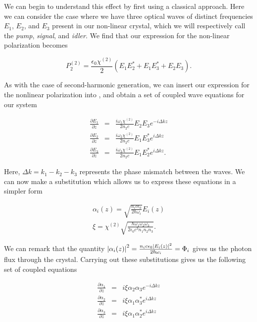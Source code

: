 We can begin to understand this effect by first using a classical approach.  Here we can consider the case where we have three optical waves of distinct frequencies $E_1$, $E_2$, and $E_3$ present in our non-linear crystal, which we will respectively call the \emph{pump}, \emph{signal}, and \emph{idler}.  We find that our expression for the non-linear polarization becomes \cite{boyd} 

\begin{equation}
  \label{eq:dfg_pnl}
  P^{(2)}_2 = \frac{\epsilon_0 \chi^{(2)}}{2} \left( E_1 E^*_2 + E_1E^*_3 + E_2E_3 \right) . 
\end{equation}

\noindent
As with the case of second-harmonic generation, we can insert our expression for the nonlinear polarization into , and obtain a set of coupled wave equations for our system \cite{Fabre90} 

\begin{eqnarray}
  \label{eq:pdc_coupled_equations}
  \frac{\partial E_1}{\partial z} &=& \frac{i \omega_1 \chi^{(2)}}{2n_2 c} E_2 E_3 e^{-i\Delta k z} \\
  \frac{\partial E_2}{\partial z} &=& \frac{i \omega_2 \chi^{(2)}}{2n_2 c} E_1 E^*_3 e^{i\Delta k z} \\
  \frac{\partial E_3}{\partial z} &=& \frac{i \omega_3 \chi^{(2)}}{2n_2 c} E_1 E^*_2e^{i\Delta k z}  .
\end{eqnarray}

\noindent
Here, $\Delta k = k_1 - k_2 - k_3$ represents the phase mismatch between the waves.  We can now make a substitution which allows us to express these equations in a simpler form

\begin{align}
  \label{eq:pdc_substitutations}
  \alpha_i(z) = \sqrt{\frac{n_i c \epsilon_0}{2 \hbar \omega_i}} E_i(z)  \\
  \xi =  \chi^{(2)} \sqrt{\frac{\hbar \omega_1 \omega_2 \omega_3}{2 \epsilon_0 c^3 n_1 n_2 n_3} } .
\end{align}

\noindent
We can remark that the quantity $\left| \alpha_i(z) \right|^2 = \frac{n_i c \epsilon_0 \left| E_i(z) \right|^2}{2 \hbar \omega_i } = \Phi_i $ gives us the photon flux through the crystal.  Carrying out these substitutions gives us the following set of coupled equations

\begin{eqnarray}
  \label{eq:lkb_coupled_wave}
  \frac{\partial \alpha_1}{\partial z} &=& i \xi \alpha_2 \alpha_3  e^{-i \Delta k z} \\
  \frac{\partial \alpha_2}{\partial z} &=& i \xi \alpha_1 \alpha^*_3  e^{i \Delta k z} \\
  \frac{\partial \alpha_3}{\partial z} &=& i \xi \alpha_1 \alpha^*_2  e^{i \Delta k z} 
\end{eqnarray}

